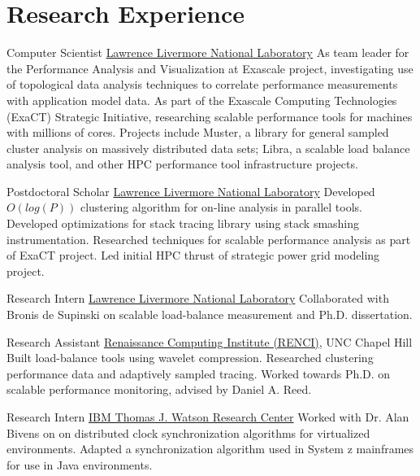 \section{Research Experience}
		{Computer Scientist}
		{\href{http://www.llnl.gov}{Lawrence Livermore National Laboratory}}{}{}
		{As team leader for the Performance Analysis and Visualization at Exascale project,
		 investigating use of topological data analysis techniques to correlate performance measurements with 
		 application model data.\newline
		 As part of the Exascale Computing Technologies (ExaCT) Strategic Initiative, researching scalable 
		 performance tools for machines with millions of cores.  Projects include Muster, a library for general
		 sampled cluster analysis on massively distributed data sets; Libra, a scalable load balance analysis tool,
		 and other HPC performance tool infrastructure projects.}

		{Postdoctoral Scholar}
		{\href{http://www.llnl.gov}{Lawrence Livermore National Laboratory}}{}{}
		{Developed $O(log(P))$ clustering algorithm for on-line analysis in parallel tools.
		 Developed optimizations for stack tracing library using stack smashing instrumentation.  Researched techniques for
		 scalable performance analysis as part of ExaCT project.  Led initial HPC thrust
		 of strategic power grid modeling project.}

		{Research Intern}
		{\href{http://www.llnl.gov}{Lawrence Livermore National Laboratory}}{}{}
		{Collaborated with Bronis de Supinski on scalable load-balance measurement and Ph.D. dissertation.}

		{Research Assistant}
		{\href{http://www.renci.org}{Renaissance Computing Institute (RENCI)}, UNC Chapel Hill}{}{}
		{Built load-balance tools using wavelet compression.  Researched clustering performance data and adaptively sampled tracing.  Worked towards Ph.D. on scalable performance monitoring, advised by Daniel A. Reed.}

		{Research Intern}
		{\href{http://www.watson.ibm.com}{IBM Thomas J. Watson Research Center}}{}{}
		{Worked with Dr. Alan Bivens on on distributed clock synchronization algorithms for virtualized environments.  Adapted a synchronization algorithm used in System z mainframes for use in Java environments.}

